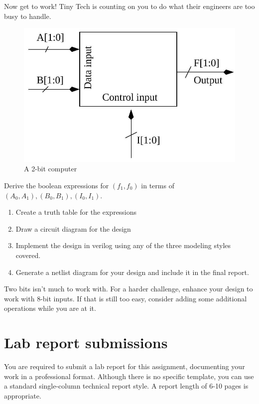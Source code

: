 \documentclass[12pt]{labmanual}
\begin{document}
Now get to work! Tiny Tech is counting on you to do what their engineers are too busy to handle.

\begin{figure}
    \centering
    \includegraphics[width=0.5\linewidth]{2024_09_05_b54c49500848b4490d27g-2.jpg}
    \caption{A 2-bit computer}
    \label{fig:2bitblock}
\end{figure}

\begin{question}
    Derive the boolean expressions for $(f_1, f_0)$ in terms of $(A_0, A_1), (B_0, B_1), (I_0, I_1)$.
    \begin{enumerate}
        \item Create a truth table for the expressions
        \item Draw a circuit diagram for the design
        \item Implement the design in verilog using any of the three modeling styles covered.
        \item Generate a netlist diagram for your design and include it in the final report.
    \end{enumerate}
\end{question}

\begin{bonusquestion}
    Two bits isn't much to work with. For a harder challenge, enhance your design to work with 8-bit inputs. If that is still too easy, consider adding some additional operations while you are at it.
\end{bonusquestion}

\section{Lab report submissions}

You are required to submit a lab report for this assignment, documenting your work in a professional format. Although there is no specific template, you can use a standard single-column technical report style. A report length of 6-10 pages is appropriate.
\end{document}
